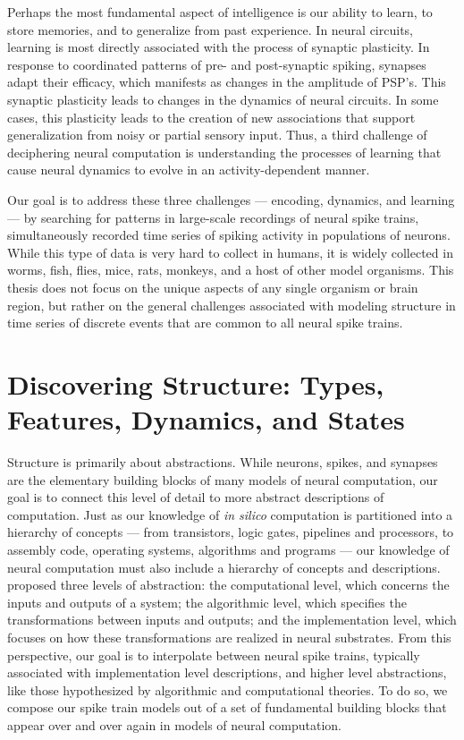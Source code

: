 Perhaps the most fundamental aspect of intelligence is our ability to
learn, to store memories, and to generalize from past experience.  In
neural circuits, learning is most directly associated with the process
of synaptic plasticity. In response to coordinated patterns of pre-
and post-synaptic spiking, synapses adapt their efficacy, which
manifests as changes in the amplitude of PSP's. This synaptic
plasticity leads to changes in the dynamics of neural circuits.  In
some cases, this plasticity leads to the creation of new associations
that support generalization from noisy or partial sensory input.
Thus, a third challenge of deciphering neural computation is
understanding the processes of learning that cause neural dynamics to
evolve in an activity-dependent manner.

Our goal is to address these three challenges --- encoding,
dynamics, and learning --- by searching for patterns in large-scale
recordings of neural spike trains, simultaneously recorded time series
of spiking activity in populations of neurons. While this type of data is
very hard to collect in humans, it is widely collected in worms, fish,
flies, mice, rats, monkeys, and a host of other model organisms.
This thesis does not focus on the unique aspects of any single organism
or brain region, but rather on the general challenges associated
with modeling structure in time series of discrete events that are
common to all neural spike trains. 


\section{Discovering Structure: Types, Features, Dynamics, and States}
Structure is primarily about abstractions.  While neurons, spikes, and
synapses are the elementary building blocks of many models of neural
computation, our goal is to connect this level of detail to more
abstract descriptions of computation.  Just as our knowledge of
\emph{in silico} computation is partitioned into a hierarchy of
concepts --- from transistors, logic gates, pipelines and processors,
to assembly code, operating systems, algorithms and programs --- our
knowledge of neural computation must also include a hierarchy of
concepts and descriptions.  \citet{marr1982vision} proposed three
levels of abstraction: the computational level, which concerns the inputs
and outputs of a system; the algorithmic level, which specifies the
transformations between inputs and outputs; and the implementation
level, which focuses on how these transformations are realized in
neural substrates.  From this perspective, our goal is to interpolate
between neural spike trains, typically associated with implementation
level descriptions, and higher level abstractions, like those
hypothesized by algorithmic and computational theories. To do so,
we compose our spike train models out of a set of fundamental
building blocks that appear over and over again in models of
neural computation. 

